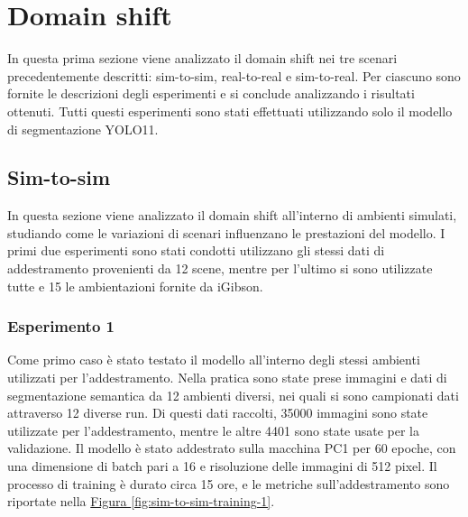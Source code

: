 \documentclass[12pt]{report}
\begin{document}
\section{Domain shift}
\label{sec:studio_domain_shift}

In questa prima sezione viene analizzato il domain shift nei tre scenari precedentemente descritti: sim-to-sim, real-to-real e sim-to-real. Per ciascuno sono fornite le descrizioni degli esperimenti e si conclude analizzando i risultati ottenuti. Tutti questi esperimenti sono stati effettuati utilizzando solo il modello di segmentazione YOLO11.

\subsection{Sim-to-sim}
\label{sec:sim_to_sim}

In questa sezione viene analizzato il domain shift all'interno di ambienti simulati, studiando come le variazioni di scenari influenzano le prestazioni del modello. I primi due esperimenti sono stati condotti utilizzano gli stessi dati di addestramento provenienti da 12 scene, mentre per l'ultimo si sono utilizzate tutte e 15 le ambientazioni fornite da iGibson.

\subsubsection{Esperimento 1}
\label{sec:esperimento_ds_1_1}

Come primo caso è stato testato il modello all'interno degli stessi ambienti utilizzati per l'addestramento. Nella pratica sono state prese immagini e dati di segmentazione semantica da 12 ambienti diversi, nei quali si sono campionati dati attraverso 12 diverse run. Di questi dati raccolti, 35000 immagini sono state utilizzate per l'addestramento, mentre le altre 4401 sono state usate per la validazione. Il modello è stato addestrato sulla macchina PC1 per 60 epoche, con una dimensione di batch pari a 16 e risoluzione delle immagini di 512 pixel. Il processo di training è durato circa 15 ore, e le metriche sull'addestramento sono riportate nella \hyperref[fig:sim-to-sim-training-1]{Figura \ref{fig:sim-to-sim-training-1}}.
\end{document}
